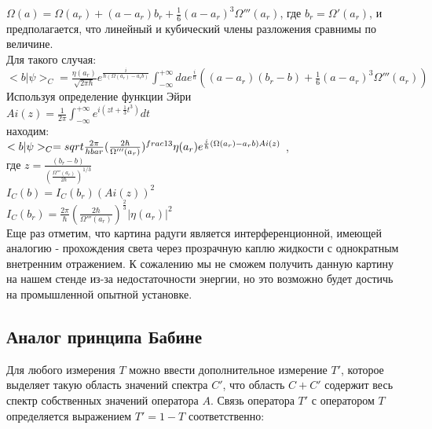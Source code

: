 \documentclass[11pt]{report}
\begin{document}
$\Omega(a) = \Omega(a_r)+(a-a_r)b_r + \frac{1}{6}(a-a_r)^3\Omega'''(a_r) $, где $b_r=\Omega'(a_r)$, и предполагается, что линейный и кубический члены разложения сравнимы по величине.\\

Для такого случая: \\

$<b|\psi>_C = \frac{\eta (a_r)}{\sqrt{2\pi \hbar}}e^{\frac{i}{\hbar(\Omega(a_r) - a_rb)}}\int_{-∞}^{+∞} dae^\frac{i}{\hbar}((a-a_r)(b_r-b)+\frac{1}{6}(a-a_r)^3\Omega'''(a_r))$  \\

Используя определение функции Эйри\\

$Ai(z) = \frac{1}{2\pi } \int_{-∞}^{+∞}e^{i(zt+\frac{1}{3}t^3)}dt $ \\

находим: \\

$<b|\psi>_C = sqrt{\frac{2\pi}{\\hbar}}(\frac{2\hbar}{\Omega'''(a_r)})^{frac{1}{3}} \eta (a_r)e^{\frac{i}{\hbar}(\Omega(a_r) - a_rb)Ai(z) }  $ ,\\

где $z = \frac{(b_r-b)}{(\frac{\Omega'''(a_r)}{2\hbar } )^{1/3}} $ \\


$I_C(b) = I_C(b_r)(Ai(z))^2$ \\

$I_C(b_r) = \frac{2\pi}{\hbar}(\frac{2\hbar}{\Omega'''(a_r)})^{\frac{2}{3}}|\eta(a_r)|^2$ \\

Еще раз отметим, что картина радуги является интерференционной, имеющей аналогию - прохождения света через прозрачную каплю жидкости с однократным внетренним отражением. К сожалению мы не сможем получить данную картину на нашем стенде из-за недостаточности энергии, но это возможно будет достичь на промышленной опытной установке.

\subsection{Аналог принципа Бабине}
Для любого измерения $T$ можно ввести дополнительное измерение $T'$, которое выделяет такую область значений спектра $C'$, что область $C+C' $ содержит весь спектр собственных значений оператора $A$. Связь оператора $T'$ с оператором $T$ определяется выражением $T' = 1-T$ соответственно: \\
\end{document}
